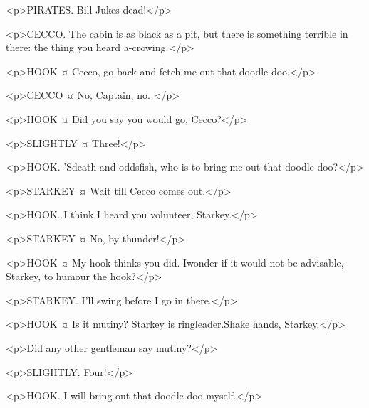 <p>PIRATES. Bill Jukes dead!</p>

<p>CECCO. The cabin is as black as a pit, but there is something terrible in there: the thing you heard a-crowing.</p>

<p>HOOK ¤
Cecco, go back and fetch me out that doodle-doo.</p>

<p>CECCO ¤
No, Captain, no.
</p>

<p>HOOK ¤
Did you say you would go, Cecco?</p>


<p>SLIGHTLY ¤
Three!</p>

<p>HOOK. 'Sdeath and oddsfish, who is to bring me out that doodle-doo?</p>


<p>STARKEY ¤
Wait till Cecco comes out.</p>


<p>HOOK. I think I heard you volunteer, Starkey.</p>

<p>STARKEY ¤
No, by thunder!</p>

<p>HOOK ¤
My hook thinks you did. Iwonder if it would not be advisable, Starkey, to humour the hook?</p>

<p>STARKEY. I'll swing before I go in there.</p>

<p>HOOK ¤
Is it mutiny? Starkey is ringleader.Shake hands, Starkey.</p>


<p>Did any other gentleman say mutiny?</p>


<p>SLIGHTLY. Four!</p>

<p>HOOK. I will bring out that doodle-doo myself.</p>


